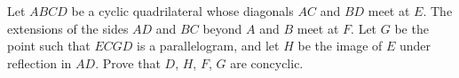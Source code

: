 Let $ABCD$ be a cyclic quadrilateral whose diagonals $AC$ and $BD$ meet at $E$. The extensions of the sides $AD$ and $BC$ beyond $A$ and $B$ meet at $F$. Let $G$ be the point such that $ECGD$ is a parallelogram, and let $H$ be the image of $E$ under reflection in $AD$. Prove that $D$, $H$, $F$, $G$ are concyclic.

